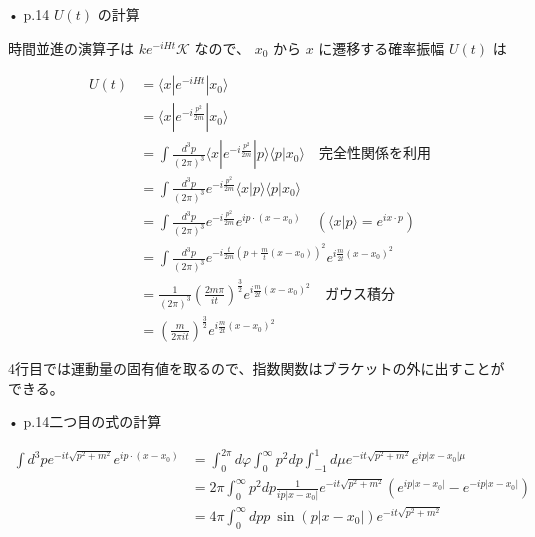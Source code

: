 \documentclass{ltjsarticle}
\begin{document}
• p.14 $U(t)$ の計算

時間並進の演算子は $ke^{-iHt}\mathcal{K}$ なので、 $x_{0}$ から $x$ に遷移する確率振幅 $U(t)$ は

\begin{align*}
U(t)&=\langle x|e^{-iHt}|x_{0}\rangle \\
&=\langle x|e^{-i\frac{p^{2}}{2m}}|x_{0}\rangle \\
&=\int\frac{d^{3}p}{(2\pi)^{3}}\langle x|e^{-i\frac{p^{2}}{2m}}|p\rangle\langle p|x_{0}\rangle \quad \text{完全性関係を利用} \\
&=\int\frac{d^{3}p}{(2\pi)^{3}}e^{-i\frac{p^{2}}{2m}}\langle x|p\rangle\langle p|x_{0}\rangle \\
&=\int\frac{d^{3}p}{(2\pi)^{3}}e^{-i\frac{p^{2}}{2m}}e^{ip\cdot(x-x_{0})} \quad (\langle x|p\rangle=e^{ix\cdot p}) \\
&=\int\frac{d^{3}p}{(2\pi)^{3}}e^{-i\frac{t}{2m}(p+\frac{m}{t}(x-x_{0}))^{2}}e^{i\frac{m}{2t}(x-x_{0})^{2}} \\
&=\frac{1}{(2\pi)^{3}}(\frac{2m\pi}{it})^{\frac{3}{2}}e^{i\frac{m}{2t}(x-x_{0})^{2}} \quad \text{ガウス積分} \\
&=\left(\frac{m}{2\pi it}\right)^{\frac{3}{2}}e^{i\frac{m}{2t}(x-x_{0})^{2}}
\end{align*}

4行目では運動量の固有値を取るので、指数関数はブラケットの外に出すことができる。

• p.14二つ目の式の計算

\begin{align*}
\int d^{3}pe^{-it\sqrt{p^{2}+m^{2}}}e^{ip\cdot(x-x_{0})} 
&=\int_{0}^{2\pi}d\varphi\int_{0}^{\infty}p^{2}dp\int_{-1}^{1}d\mu e^{-it\sqrt{p^{2}+m^{2}}}e^{ip|x-x_{0}|\mu} \\
&=2\pi\int_{0}^{\infty}p^{2}dp\frac{1}{ip|x-x_{0}|}e^{-it\sqrt{p^{2}+m^{2}}}(e^{ip|x-x_{0}|}-e^{-ip|x-x_{0}|}) \\
&=4\pi\int_{0}^{\infty}dpp~\sin(p|x-x_{0}|)e^{-it\sqrt{p^{2}+m^{2}}}
\end{align*}
\end{document}
